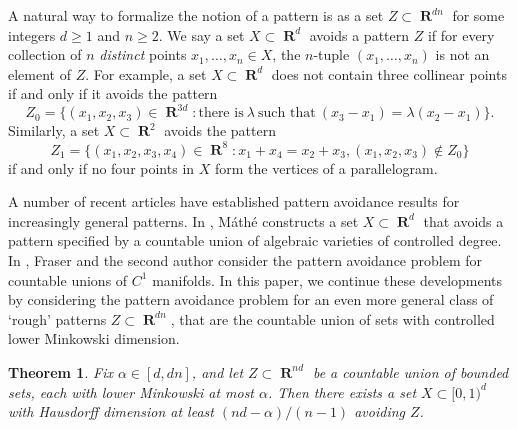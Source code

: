 \documentclass[dvipsnames,letterpaper,12pt]{article}
\numberwithin{equation}{section}
\theoremstyle{plain}
\newtheorem{theorem}{Theorem}
\theoremstyle{remark}
\DeclareMathOperator{\RR}{\mathbf{R}}
\begin{document}
A natural way to formalize the notion of a pattern is as a set $Z \subset \RR^{dn}$ for some integers $d \geq 1$ and $n \geq 2$. We say a set $X \subset \RR^d$ avoids a pattern $Z$ if for every collection of $n$ {\it distinct} points $x_1, \dots, x_n \in X$, the $n$-tuple $(x_1, \dots, x_n)$ is not an element of $Z$. For example, a set $X \subset \RR^d$ does not contain three collinear points if and only if it avoids the pattern
%
\[ Z_0 = \{ (x_1,x_2,x_3) \in \RR^{3d} : \text{there is}\ \lambda\ \text{such that}\ (x_3 - x_1) = \lambda (x_2 - x_1) \}. \]
%
Similarly, a set $X \subset \RR^2$ avoids the pattern 
%
\[ Z_1 = \{ (x_1,x_2,x_3,x_4) \in \RR^8 : x_1 + x_4 = x_2 + x_3, (x_1,x_2,x_3) \not \in Z_0 \} \]
%
if and only if no four points in $X$ form the vertices of a parallelogram.

A number of recent articles have established pattern avoidance results for increasingly general patterns. In \cite{Mathe}, M\'{a}th\'{e} constructs a set $X\subset\RR^d$ that avoids a pattern specified by a countable union of algebraic varieties of controlled degree. In \cite{MalabikaRob}, Fraser and the second author consider the pattern avoidance problem for countable unions of $C^1$ manifolds.
In this paper, we continue these developments by considering the pattern avoidance problem for an even more general class of `rough' patterns $Z \subset \RR^{dn}$, that are the countable union of sets with controlled lower Minkowski dimension.

\begin{theorem}\label{mainTheorem}
	Fix $\alpha \in [d,dn]$, and let $Z \subset \RR^{nd}$ be a countable union of bounded sets, each with lower Minkowski at most $\alpha$. Then there exists a set $X \subset [0,1)^d$ with Hausdorff dimension at least $(nd - \alpha)/(n-1)$ avoiding $Z$.
\end{theorem}
\end{document}
